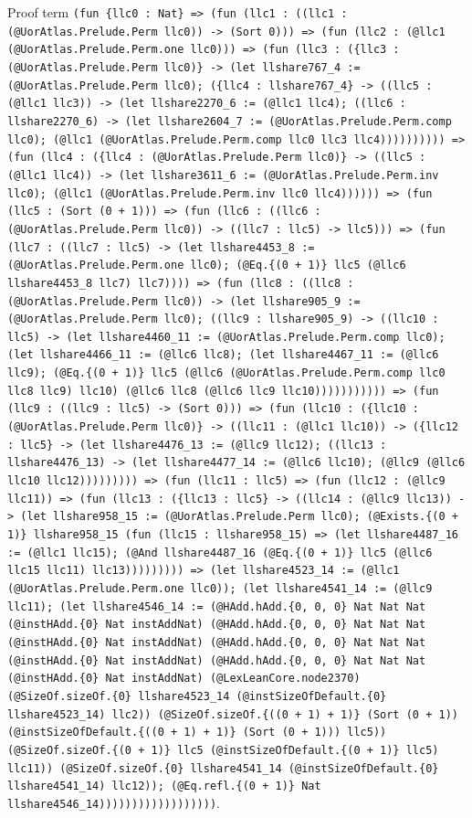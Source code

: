 \documentclass[11pt]{article}
\begin{document}
\noindent Proof term \texttt{(fun \{llc0 : Nat\} => (fun (llc1 : ((llc1 : (@UorAtlas.Prelude.Perm llc0)) -> (Sort 0))) => (fun (llc2 : (@llc1 (@UorAtlas.Prelude.Perm.one llc0))) => (fun (llc3 : (\{llc3 : (@UorAtlas.Prelude.Perm llc0)\} -> (let llshare767\_4 := (@UorAtlas.Prelude.Perm llc0); (\{llc4 : llshare767\_4\} -> ((llc5 : (@llc1 llc3)) -> (let llshare2270\_6 := (@llc1 llc4); ((llc6 : llshare2270\_6) -> (let llshare2604\_7 := (@UorAtlas.Prelude.Perm.comp llc0); (@llc1 (@UorAtlas.Prelude.Perm.comp llc0 llc3 llc4)))))))))) => (fun (llc4 : (\{llc4 : (@UorAtlas.Prelude.Perm llc0)\} -> ((llc5 : (@llc1 llc4)) -> (let llshare3611\_6 := (@UorAtlas.Prelude.Perm.inv llc0); (@llc1 (@UorAtlas.Prelude.Perm.inv llc0 llc4)))))) => (fun (llc5 : (Sort (0 + 1))) => (fun (llc6 : ((llc6 : (@UorAtlas.Prelude.Perm llc0)) -> ((llc7 : llc5) -> llc5))) => (fun (llc7 : ((llc7 : llc5) -> (let llshare4453\_8 := (@UorAtlas.Prelude.Perm.one llc0); (@Eq.\{(0 + 1)\} llc5 (@llc6 llshare4453\_8 llc7) llc7)))) => (fun (llc8 : ((llc8 : (@UorAtlas.Prelude.Perm llc0)) -> (let llshare905\_9 := (@UorAtlas.Prelude.Perm llc0); ((llc9 : llshare905\_9) -> ((llc10 : llc5) -> (let llshare4460\_11 := (@UorAtlas.Prelude.Perm.comp llc0); (let llshare4466\_11 := (@llc6 llc8); (let llshare4467\_11 := (@llc6 llc9); (@Eq.\{(0 + 1)\} llc5 (@llc6 (@UorAtlas.Prelude.Perm.comp llc0 llc8 llc9) llc10) (@llc6 llc8 (@llc6 llc9 llc10))))))))))) => (fun (llc9 : ((llc9 : llc5) -> (Sort 0))) => (fun (llc10 : (\{llc10 : (@UorAtlas.Prelude.Perm llc0)\} -> ((llc11 : (@llc1 llc10)) -> (\{llc12 : llc5\} -> (let llshare4476\_13 := (@llc9 llc12); ((llc13 : llshare4476\_13) -> (let llshare4477\_14 := (@llc6 llc10); (@llc9 (@llc6 llc10 llc12))))))))) => (fun (llc11 : llc5) => (fun (llc12 : (@llc9 llc11)) => (fun (llc13 : (\{llc13 : llc5\} -> ((llc14 : (@llc9 llc13)) -> (let llshare958\_15 := (@UorAtlas.Prelude.Perm llc0); (@Exists.\{(0 + 1)\} llshare958\_15 (fun (llc15 : llshare958\_15) => (let llshare4487\_16 := (@llc1 llc15); (@And llshare4487\_16 (@Eq.\{(0 + 1)\} llc5 (@llc6 llc15 llc11) llc13))))))))) => (let llshare4523\_14 := (@llc1 (@UorAtlas.Prelude.Perm.one llc0)); (let llshare4541\_14 := (@llc9 llc11); (let llshare4546\_14 := (@HAdd.hAdd.\{0, 0, 0\} Nat Nat Nat (@instHAdd.\{0\} Nat instAddNat) (@HAdd.hAdd.\{0, 0, 0\} Nat Nat Nat (@instHAdd.\{0\} Nat instAddNat) (@HAdd.hAdd.\{0, 0, 0\} Nat Nat Nat (@instHAdd.\{0\} Nat instAddNat) (@HAdd.hAdd.\{0, 0, 0\} Nat Nat Nat (@instHAdd.\{0\} Nat instAddNat) (@LexLeanCore.node2370) (@SizeOf.sizeOf.\{0\} llshare4523\_14 (@instSizeOfDefault.\{0\} llshare4523\_14) llc2)) (@SizeOf.sizeOf.\{((0 + 1) + 1)\} (Sort (0 + 1)) (@instSizeOfDefault.\{((0 + 1) + 1)\} (Sort (0 + 1))) llc5)) (@SizeOf.sizeOf.\{(0 + 1)\} llc5 (@instSizeOfDefault.\{(0 + 1)\} llc5) llc11)) (@SizeOf.sizeOf.\{0\} llshare4541\_14 (@instSizeOfDefault.\{0\} llshare4541\_14) llc12)); (@Eq.refl.\{(0 + 1)\} Nat llshare4546\_14))))))))))))))))))}.\par
\end{document}
